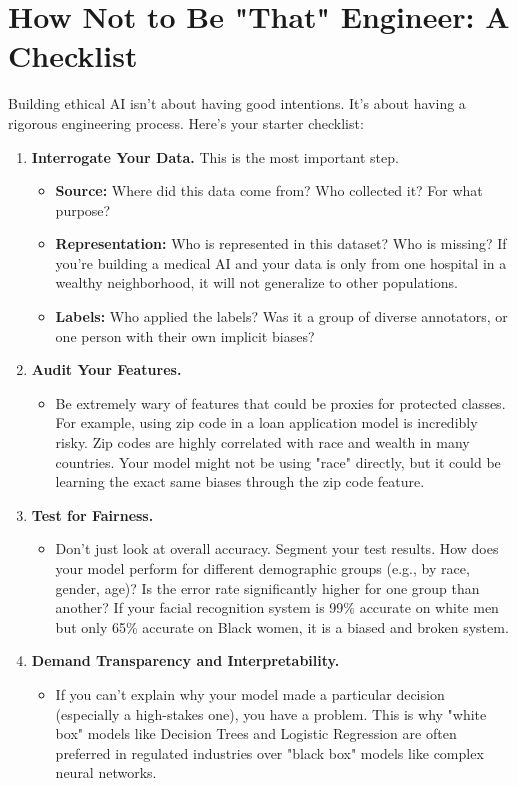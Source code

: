\documentclass[11pt, letterpaper, openany]{book}
\begin{document}
\section{How Not to Be "That" Engineer: A Checklist}

Building ethical AI isn't about having good intentions. It's about having a rigorous engineering process. Here's your starter checklist:
\begin{enumerate}
    \item \textbf{Interrogate Your Data.} This is the most important step.
    \begin{itemize}
        \item \textbf{Source:} Where did this data come from? Who collected it? For what purpose?
        \item \textbf{Representation:} Who is represented in this dataset? Who is missing? If you're building a medical AI and your data is only from one hospital in a wealthy neighborhood, it will not generalize to other populations.
        \item \textbf{Labels:} Who applied the labels? Was it a group of diverse annotators, or one person with their own implicit biases?
    \end{itemize}
    \item \textbf{Audit Your Features.}
    \begin{itemize}
        \item Be extremely wary of features that could be proxies for protected classes. For example, using zip code in a loan application model is incredibly risky. Zip codes are highly correlated with race and wealth in many countries. Your model might not be using "race" directly, but it could be learning the exact same biases through the zip code feature.
    \end{itemize}
    \item \textbf{Test for Fairness.}
    \begin{itemize}
        \item Don't just look at overall accuracy. Segment your test results. How does your model perform for different demographic groups (e.g., by race, gender, age)? Is the error rate significantly higher for one group than another? If your facial recognition system is 99\% accurate on white men but only 65\% accurate on Black women, it is a biased and broken system.
    \end{itemize}
    \item \textbf{Demand Transparency and Interpretability.}
    \begin{itemize}
        \item If you can't explain why your model made a particular decision (especially a high-stakes one), you have a problem. This is why "white box" models like Decision Trees and Logistic Regression are often preferred in regulated industries over "black box" models like complex neural networks.
    \end{itemize}
\end{enumerate}
\end{document}
